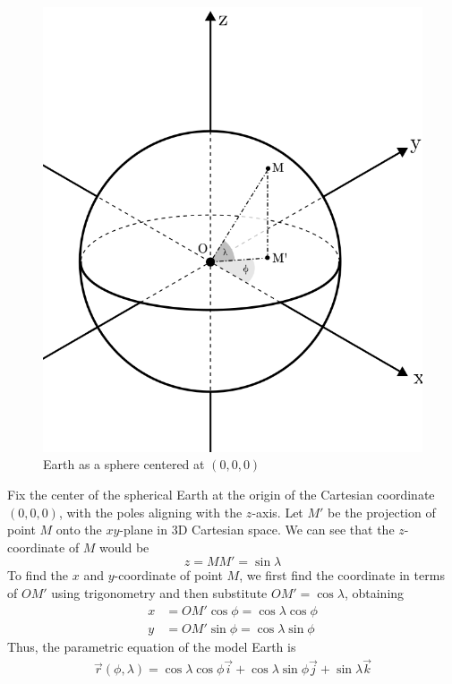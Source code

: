 \begin{figure}
    \centering
    \includegraphics[width=0.75\linewidth]
    {figures/earth unit sphere.png}
    \caption{Earth as a sphere centered at $(0,0,0)$}
    \label{fig:figure2}
\end{figure}

Fix the center of the spherical Earth at the origin of the Cartesian coordinate $(0,0,0)$, with
the poles aligning with the $z$-axis. Let $M'$ be the projection of point $M$ onto
the $xy$-plane in 3D Cartesian space. We can see that the $z$-coordinate of $M$
would be
\begin{equation*}
    z= MM'=\sin\lambda
\end{equation*}
To find the $x$ and $y$-coordinate of point $M$, we first find the coordinate in terms of $OM'$ using
trigonometry and then substitute $OM'=\cos\lambda$, obtaining
\begin{align*}
    x&=OM'\cos\phi=\cos\lambda\cos\phi\\
    y&=OM'\sin\phi=\cos\lambda\sin\phi
\end{align*}
Thus, the parametric equation of the model Earth is
\begin{align}
    \vec{r}(\phi,\lambda)=\cos\lambda\cos\phi\vec{i} + \cos\lambda\sin\phi\vec{j} + \sin\lambda\vec{k}
\end{align}